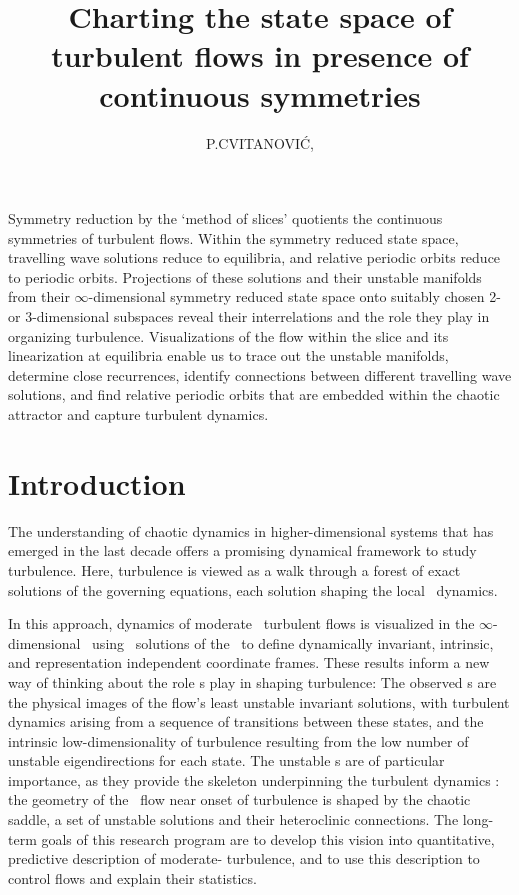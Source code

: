 \documentclass{jfm}
\title[Charting the state space of turbulent flows]
{Charting the state space of turbulent flows
 in presence of continuous symmetries}
\author[P.\ Cvitanovi{\'c}]
{
P.\ns C\ls V\ls I\ls T\ls A\ls N\ls O\ls V\ls I\ls \'C,
}
\affiliation{
 School of Physics,
 Georgia Institute of Technology,
 Atlanta, GA  30332, USA
}
\begin{document}
\maketitle

Symmetry reduction by the `method of slices'
quotients the continuous symmetries of turbulent flows. Within the
symmetry reduced state space, travelling wave solutions reduce to
equilibria, and relative periodic orbits reduce to periodic orbits.
Projections of these solutions and their unstable manifolds from their
$\infty$-dimensional symmetry reduced state space onto suitably chosen 2-
or 3-dimensional subspaces reveal their interrelations and the role they
play in organizing turbulence. Visualizations
of the flow within the slice and its linearization at equilibria enable
us to trace out the unstable manifolds, determine close recurrences,
identify connections between different travelling wave solutions, and
find relative periodic orbits that
are embedded within the chaotic attractor and capture turbulent dynamics.


\section{Introduction}
\label{s:intro}

The understanding of chaotic dynamics in higher-dimensional systems that
has emerged in the last decade offers a promising dynamical framework to
study turbulence. Here, turbulence is viewed as a walk through a forest
of exact solutions of the governing equations, each solution shaping the
local \statesp\ dynamics.

In this approach, dynamics of moderate \Reynolds\ turbulent flows is
visualized in the $\infty$-dimensional \stateDsp\  using \eqv\ solutions
of the \NSe\ to define dynamically invariant, intrinsic, and
representation independent coordinate frames.
These results inform a new way of thinking about the role {\recurrStr s}
play in shaping turbulence:
The observed {\cohStr s} are the physical images of the flow's
least unstable invariant solutions, with
turbulent dynamics arising from a sequence of transitions between
these states, and
the intrinsic low-dimensionality of turbulence resulting from the low
number of unstable eigendirections for each state.
The unstable \po s are of particular
importance, as they provide the skeleton underpinning the
turbulent dynamics \citep{DasBuch}: the geometry of the \statesp\ flow
near onset of turbulence is shaped by the chaotic saddle, a set of
unstable solutions and their heteroclinic connections.
The long-term goals of this research program are to develop this vision
into quantitative,  predictive description of moderate-{\Reynolds}
turbulence, and to use this description to control flows and explain their statistics.
\end{document}
